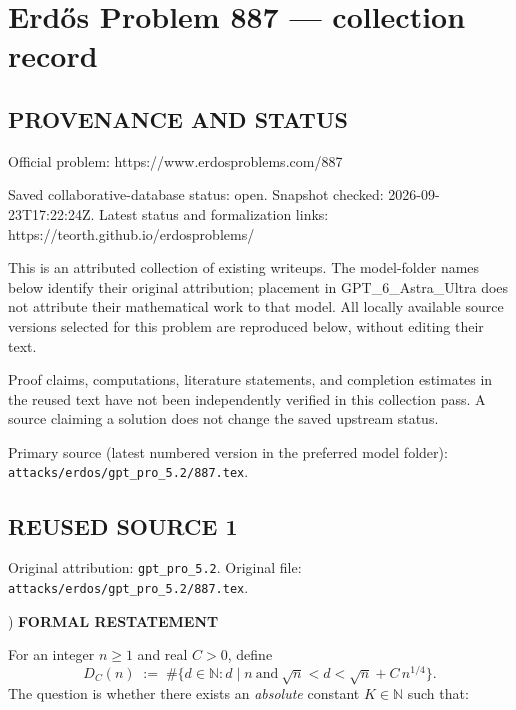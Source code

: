 \section*{Erd\H{o}s Problem 887 --- collection record}

\subsection*{PROVENANCE AND STATUS}
Official problem: https://www.erdosproblems.com/887

Saved collaborative-database status: open.
Snapshot checked: 2026-09-23T17:22:24Z.
Latest status and formalization links: https://teorth.github.io/erdosproblems/

This is an attributed collection of existing writeups. The model-folder names below identify their original attribution; placement in GPT\_6\_Astra\_Ultra does not attribute their mathematical work to that model. All locally available source versions selected for this problem are reproduced below, without editing their text.

Proof claims, computations, literature statements, and completion estimates in the reused text have not been independently verified in this collection pass. A source claiming a solution does not change the saved upstream status.

Primary source (latest numbered version in the preferred model folder): \texttt{attacks/erdos/gpt\_pro\_5.2/887.tex}.

\subsection*{REUSED SOURCE 1}
Original attribution: \texttt{gpt\_pro\_5.2}.
Original file: \texttt{attacks/erdos/gpt\_pro\_5.2/887.tex}.



) \textbf{FORMAL RESTATEMENT}

\noindent For an integer $n\ge 1$ and real $C>0$, define
\[
D_C(n) \;:=\; \#\Big\{d\in\mathbb{N}: d\mid n\ \text{and}\ \sqrt n< d < \sqrt n + C\,n^{1/4}\Big\}.
\]
The question is whether there exists an \emph{absolute} constant $K\in\mathbb{N}$ such that:

